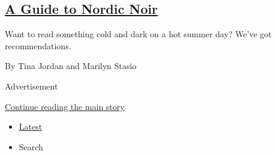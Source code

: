 \begin{enumerate}
  \hypertarget{a-guide-to-nordic-noir}{%
  \subsection{\texorpdfstring{\href{/2020/07/24/books/review/nordic-noir-guide.html}{A
  Guide to Nordic
  Noir}}{A Guide to Nordic Noir}}\label{a-guide-to-nordic-noir}}

  Want to read something cold and dark on a hot summer day? We've got
  recommendations.

  By Tina Jordan and Marilyn Stasio
\end{enumerate}

Advertisement

\protect\hyperlink{after-mid1}{Continue reading the main story}

\begin{itemize}
\tightlist
\item
  \protect\hyperlink{stream-panel}{Latest}
\item
  Search
\end{itemize}

